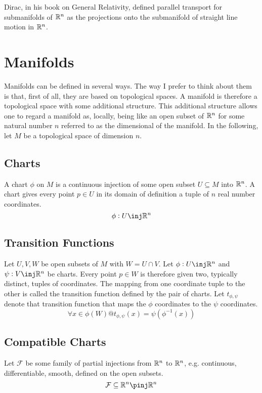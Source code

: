\documentclass[11pt, oneside]{article}
\begin{document}
Dirac, in his book on General Relativity, defined parallel transport for submanifolds of  $\mathbb{R}^n$ as the projections onto the submanifold of
straight line motion in $\mathbb{R}^n$.

\section{Manifolds}

Manifolds can be defined in several ways.
The way I prefer to think about them is that, first of all, they are  based on topological spaces.
A manifold is therefore a topological space with some additional structure.
This additional structure allows one to regard a manifold as, locally, being like an open subset of $\mathbb{R}^n$
for some natural number $n$ referred to as the dimensional of the manifold.
In the following, let $M$ be a topological space of dimension $n$.

\subsection{Charts}
A chart $\phi$ on $M$ is a continuous injection of some open subset $U \subseteq M$ into $\mathbb{R}^n$.
A chart gives every point $p \in U$ in its domain of definition a tuple of $n$ real number coordinates.
\begin{equation}
	\phi: U \inj \R^n
\end{equation}

\subsection{Transition Functions}
Let $U, V, W$ be open subsets of $M$ with $W = U \cap V$.
Let $\phi: U \inj \R^n$ and $\psi: V \inj \R^n$ be charts.
Every point $p \in W$ is therefore given two, typically distinct, tuples of coordinates.
The mapping from one coordinate tuple to the other is called the transition function defined by the pair of charts.
Let $t_{\phi,\psi}$ denote that transition function that maps the $\phi$ coordinates to the $\psi$ coordinates.
\begin{equation}
	\forall x \in \phi(W) @ t_{\phi,\psi}(x) = \psi(\phi^{-1}(x))
\end{equation}

\subsection{Compatible Charts}
Let $\mathcal{F}$ be some family of partial injections from $\mathbb{R}^n$ to $\mathbb{R}^n$, e.g. continuous, differentiable, smooth, defined on the open subsets.
\begin{equation}
	\mathcal{F} \subseteq \R^n \pinj \R^n
\end{equation}
\end{document}
